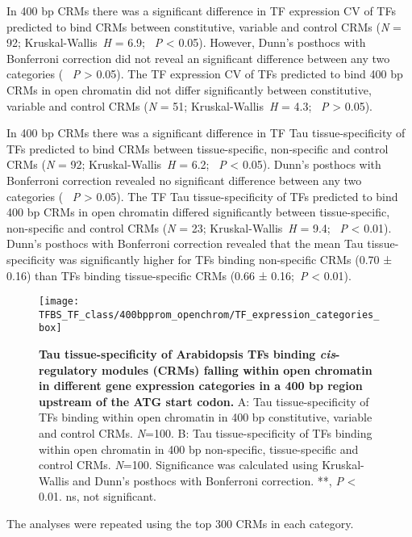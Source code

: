 \documentclass[../main.tex]{subfiles}
\begin{document}
In 400 bp CRMs there was a significant difference in TF expression CV of TFs predicted to bind CRMs between constitutive, variable and control CRMs (\textit{N} = 92; Kruskal\hyp{}Wallis~\textit{H} = 6.9; ~\textit{P} \textless{} 0.05).
However, Dunn's posthocs with Bonferroni correction did not reveal an significant difference between any two categories ( ~\textit{P} \textgreater{} 0.05).
The TF expression CV of TFs predicted to bind 400 bp CRMs in open chromatin did not differ significantly between constitutive, variable and control CRMs (\textit{N} = 51; Kruskal\hyp{}Wallis~\textit{H} = 4.3; ~\textit{P} \textgreater{} 0.05).

In 400 bp CRMs there was a significant difference in TF Tau tissue\hyp{}specificity of TFs predicted to bind CRMs between tissue\hyp{}specific, non\hyp{}specific and control CRMs (\textit{N} = 92; Kruskal\hyp{}Wallis~\textit{H} = 6.2; ~\textit{P} \textless{} 0.05).
Dunn's posthocs with Bonferroni correction revealed no significant difference between any two categories ( ~\textit{P} \textgreater{} 0.05).
The TF Tau tissue\hyp{}specificity of TFs predicted to bind 400 bp CRMs in open chromatin differed significantly between tissue\hyp{}specific, non\hyp{}specific and control CRMs (\textit{N} = 23; Kruskal\hyp{}Wallis~\textit{H} = 9.4; ~\textit{P} \textless{} 0.01).
Dunn's posthocs with Bonferroni correction revealed that the mean Tau tissue\hyp{}specificity was significantly higher for TFs binding non\hyp{}specific CRMs (0.70 ± 0.16) than TFs binding tissue\hyp{}specific CRMs (0.66 ± 0.16;~\textit{P} \textless{} 0.01).
\begin{figure}[hbt!]
	\begin{center}
		\capstart
		\texttt{[image: TFBS\_TF\_class/400bpprom\_openchrom/TF\_expression\_categories\_box]}
		\caption{
			\textbf{Tau tissue\hyp{}specificity of Arabidopsis TFs binding \textit{cis}\hyp{}regulatory modules (CRMs) falling within open chromatin in different gene expression categories in a 400 bp region upstream of the ATG start codon.}		
			A: Tau tissue\hyp{}specificity of TFs binding within open chromatin in 400 bp constitutive, variable and control CRMs. \textit{N}=100.
			B: Tau tissue\hyp{}specificity of TFs binding within open chromatin in 400 bp non\hyp{}specific, tissue\hyp{}specific and control CRMs. \textit{N}=100.
			Significance was calculated using Kruskal\hyp{}Wallis and Dunn's posthocs with Bonferroni correction.
			**, \textit{P} \textless{} 0.01. ns, not significant.
			\label{fig:tfbs-coverage-400bpprom-openchrom}
		}
	\end{center}
\end{figure}
The analyses were repeated using the top 300 CRMs in each category.
\end{document}
